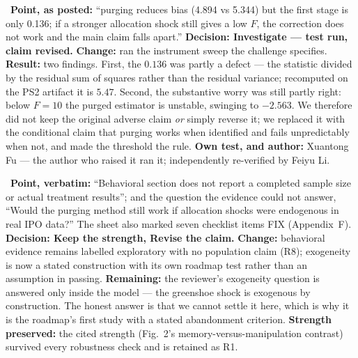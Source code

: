 \begin{description}[leftmargin=0pt,labelsep=4pt,style=unboxed,itemsep=4pt]
\item[\textbf{Xuantong Fu --- individual self-challenge, posted to the class thread 14 October 2026}]\ \textbf{Point, as posted:} ``purging reduces bias (4.894 vs 5.344) but the first stage is only 0.136; if a stronger allocation shock still gives a low $F$, the correction does not work and the main claim falls apart.'' \textbf{Decision: Investigate --- test run, claim revised.} \textbf{Change:} ran the instrument sweep the challenge specifies. \textbf{Result:} two findings. First, the $0.136$ was partly a defect --- the statistic divided by the residual sum of squares rather than the residual variance; recomputed on the PS2 artifact it is $5.47$. Second, the substantive worry was still partly right: below $F=10$ the purged estimator is unstable, swinging to $-2.563$. We therefore did not keep the original adverse claim \emph{or} simply reverse it; we replaced it with the conditional claim that purging works when identified and fails unpredictably when not, and made the threshold the rule. \textbf{Own test, and author:} Xuantong Fu --- the author who raised it ran it; independently re-verified by Feiyu Li.
\item[\textbf{Aaron Wang (Team FP8), signed review sheet, 28 September 2026, recommendation Revise}]\ \textbf{Point, verbatim:} ``Behavioral section does not report a completed sample size or actual treatment results''; and the question the evidence could not answer, ``Would the purging method still work if allocation shocks were endogenous in real IPO data?'' The sheet also marked seven checklist items FIX (Appendix~F). \textbf{Decision: Keep the strength, Revise the claim.} \textbf{Change:} behavioral evidence remains labelled exploratory with no population claim (R8); exogeneity is now a stated construction with its own roadmap test rather than an assumption in passing. \textbf{Remaining:} the reviewer's exogeneity question is answered only inside the model --- the greenshoe shock is exogenous by construction. The honest answer is that we cannot settle it here, which is why it is the roadmap's first study with a stated abandonment criterion. \textbf{Strength preserved:} the cited strength (Fig.~2's memory-versus-manipulation contrast) survived every robustness check and is retained as R1.

\end{description}
